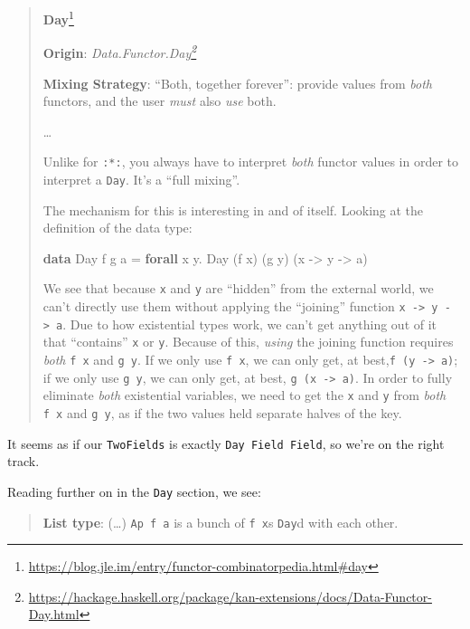 \documentclass[]{article}
\newenvironment{Shaded}{}{}
\newcommand{\DataTypeTok}[1]{\textcolor[rgb]{0.56,0.13,0.00}{#1}}
\newcommand{\KeywordTok}[1]{\textcolor[rgb]{0.00,0.44,0.13}{\textbf{#1}}}
\newcommand{\NormalTok}[1]{#1}
\newcommand{\OperatorTok}[1]{\textcolor[rgb]{0.40,0.40,0.40}{#1}}
\newcommand{\OtherTok}[1]{\textcolor[rgb]{0.00,0.44,0.13}{#1}}
\renewcommand{\href}[2]{#2\footnote{\url{#1}}}
\begin{document}
\begin{quote}
\href{https://blog.jle.im/entry/functor-combinatorpedia.html\#day}{\textbf{Day}}

\textbf{Origin}:
\emph{\href{https://hackage.haskell.org/package/kan-extensions/docs/Data-Functor-Day.html}{Data.Functor.Day}}

\textbf{Mixing Strategy}: ``Both, together forever'': provide values from
\emph{both} functors, and the user \emph{must} also \emph{use} both.

\ldots{}

Unlike for \texttt{:*:}, you always have to interpret \emph{both} functor values
in order to interpret a \texttt{Day}. It's a ``full mixing''.

The mechanism for this is interesting in and of itself. Looking at the
definition of the data type:

\begin{Shaded}
\begin{Highlighting}[]
\KeywordTok{data} \DataTypeTok{Day}\NormalTok{ f g a }\OtherTok{=} \KeywordTok{forall}\NormalTok{ x y}\OperatorTok{.} \DataTypeTok{Day}\NormalTok{ (f x) (g y) (x }\OtherTok{{-}>}\NormalTok{ y }\OtherTok{{-}>}\NormalTok{ a)}
\end{Highlighting}
\end{Shaded}

We see that because \texttt{x} and \texttt{y} are ``hidden'' from the external
world, we can't directly use them without applying the ``joining'' function
\texttt{x\ -\textgreater{}\ y\ -\textgreater{}\ a}. Due to how existential types
work, we can't get anything out of it that ``contains'' \texttt{x} or
\texttt{y}. Because of this, \emph{using} the joining function requires
\emph{both} \texttt{f\ x} and \texttt{g\ y}. If we only use \texttt{f\ x}, we
can only get, at best,\texttt{f\ (y\ -\textgreater{}\ a)}; if we only use
\texttt{g\ y}, we can only get, at best, \texttt{g\ (x\ -\textgreater{}\ a)}. In
order to fully eliminate \emph{both} existential variables, we need to get the
\texttt{x} and \texttt{y} from \emph{both} \texttt{f\ x} and \texttt{g\ y}, as
if the two values held separate halves of the key.
\end{quote}

It seems as if our \texttt{TwoFields} is exactly \texttt{Day\ Field\ Field}, so
we're on the right track.

Reading further on in the \texttt{Day} section, we see:

\begin{quote}
\textbf{List type}: (\ldots) \texttt{Ap\ f\ a} is a bunch of \texttt{f\ x}s
\texttt{Day}d with each other.
\end{quote}
\end{document}
